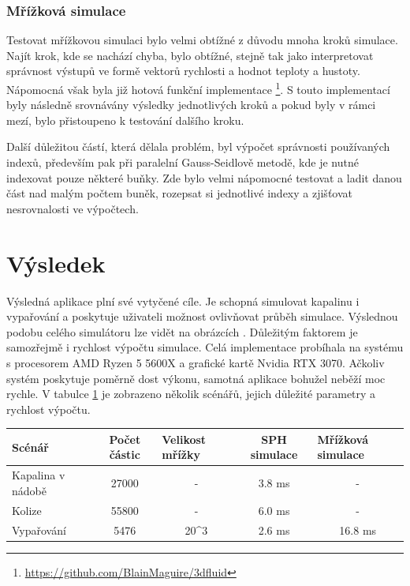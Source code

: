 \subsubsection{Mřížková simulace}
Testovat mřížkovou simulaci bylo velmi obtížné z důvodu mnoha kroků simulace. Najít krok, kde se nachází chyba, bylo obtížné, stejně tak jako interpretovat správnost výstupů ve formě vektorů rychlosti a hodnot teploty a hustoty. Nápomocná však byla již hotová funkční implementace \footnote{\url{https://github.com/BlainMaguire/3dfluid}}. S touto implementací byly následně srovnávány výsledky jednotlivých kroků a pokud byly v rámci mezí, bylo přistoupeno k testování dalšího kroku.

Další důležitou částí, která dělala problém, byl výpočet správnosti používaných indexů, především pak při paralelní Gauss-Seidlově metodě, kde je nutné indexovat pouze některé buňky. Zde bylo velmi nápomocné testovat a ladit danou část nad malým počtem buněk, rozepsat si jednotlivé indexy a zjišťovat nesrovnalosti ve výpočtech.

\section{Výsledek}
\label{chapter:vysledek}

Výsledná aplikace plní své vytyčené cíle. Je schopná simulovat kapalinu i vypařování a poskytuje uživateli možnost ovlivňovat průběh simulace. Výslednou podobu celého simulátoru lze vidět na obrázcích . Důležitým faktorem je samozřejmě i rychlost výpočtu simulace. Celá implementace probíhala na systému s procesorem AMD Ryzen 5 5600X a grafické kartě Nvidia RTX 3070. Ačkoliv systém poskytuje poměrně dost výkonu, samotná aplikace bohužel neběží moc rychle. V tabulce \ref{tab:times} je zobrazeno několik scénářů, jejich důležité parametry a rychlost výpočtu.

\begin{table}[h]
\begin{tabular}{l|c|c|c|c}
Scénář            & Počet částic & \multicolumn{1}{l|}{Velikost mřížky} & SPH simulace & \multicolumn{1}{l}{Mřížková simulace} \\ \hline
Kapalina v nádobě & 27000        & -                                    & 3.8 ms       & -                                     \\
Kolize            & 55800        & -                                    & 6.0 ms       & -                                     \\
Vypařování        & 5476         & 20^3                                   & 2.6 ms       & 16.8 ms                              
\end{tabular}
\label{tab:times}
\end{table}

